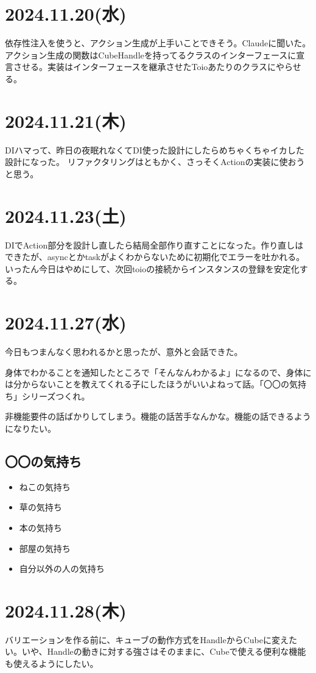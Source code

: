 \documentclass[fleqn,twocolumn]{mynote}
\begin{document}
  \section*{2024.11.20(水)}
  依存性注入を使うと、アクション生成が上手いことできそう。Claudeに聞いた。アクション生成の関数はCubeHandleを持ってるクラスのインターフェースに宣言させる。実装はインターフェースを継承させたToioあたりのクラスにやらせる。

  \section*{2024.11.21(木)}
  DIハマって、昨日の夜眠れなくてDI使った設計にしたらめちゃくちゃイカした設計になった。
  リファクタリングはともかく、さっそくActionの実装に使おうと思う。

  \section*{2024.11.23(土)}
  DIでAction部分を設計し直したら結局全部作り直すことになった。作り直しはできたが、asyncとかtaskがよくわからないために初期化でエラーを吐かれる。いったん今日はやめにして、次回toioの接続からインスタンスの登録を安定化する。

  \section*{2024.11.27(水)}
  今日もつまんなく思われるかと思ったが、意外と会話できた。

  身体でわかることを通知したところで「そんなんわかるよ」になるので、身体には分からないことを教えてくれる子にしたほうがいいよねって話。「〇〇の気持ち」シリーズつくれ。

  非機能要件の話ばかりしてしまう。機能の話苦手なんかな。機能の話できるようになりたい。

  \subsection{〇〇の気持ち}
  \begin{itemize}
    \item ねこの気持ち
    \item 草の気持ち
    \item 本の気持ち
    \item  部屋の気持ち
    \item 自分以外の人の気持ち
  \end{itemize}

  \section*{2024.11.28(木)}
  バリエーションを作る前に、キューブの動作方式をHandleからCubeに変えたい。いや、Handleの動きに対する強さはそのままに、Cubeで使える便利な機能も使えるようにしたい。
\end{document}
